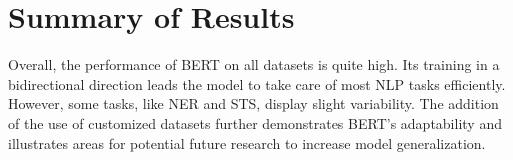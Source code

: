\documentclass{article}
\begin{document}
\section{Summary of Results}
Overall, the performance of BERT on all datasets is quite high. Its training in a bidirectional direction leads the model to take care of most NLP tasks efficiently. However, some tasks, like NER and STS, display slight variability. The addition of the use of customized datasets further demonstrates BERT's adaptability and illustrates areas for potential future research to increase model generalization.
\end{document}
